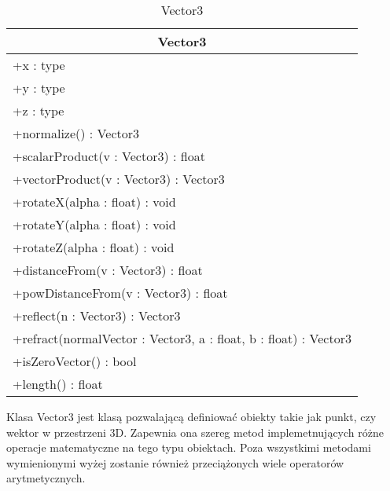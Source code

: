 \footnotesize
\begin{longtable}{|p{14cm}|}
    \caption{Vector3} \label{tab:Vector3} \\ \hline
    \multicolumn{1}{|c|}{Vector3} \\ \hline
    +x : type \\
    +y : type \\
    +z : type \\
     \hline
	+normalize() : Vector3 \\ 
	+scalarProduct(v : Vector3) : float \\
	+vectorProduct(v : Vector3) : Vector3 \\
	+rotateX(alpha : float) : void \\
	+rotateY(alpha : float) : void \\
	+rotateZ(alpha : float) : void \\
	+distanceFrom(v : Vector3) : float \\
	+powDistanceFrom(v : Vector3) : float \\
	+reflect(n : Vector3) : Vector3 \\
	+refract(normalVector : Vector3, a : float, b : float) : Vector3 \\
	+isZeroVector() : bool \\
	+length() : float \\
	\hline
\end{longtable}
\normalsize

Klasa Vector3 jest klasą pozwalającą definiować obiekty takie jak punkt, czy wektor w przestrzeni 3D. Zapewnia ona szereg metod implemetnujących różne operacje matematyczne na tego typu obiektach. Poza wszystkimi metodami wymienionymi wyżej zostanie również przeciążonych wiele operatorów arytmetycznych.
